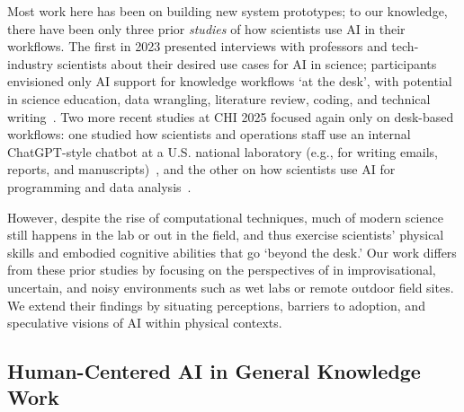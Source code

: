 Most work here has been on building new system prototypes; to our knowledge, there have been only three prior \emph{studies} of how scientists use AI in their workflows. The first in 2023 presented interviews with professors and tech-industry scientists  about their desired use cases for AI in science; participants envisioned only AI support for knowledge workflows `at the desk', with potential in science education, data wrangling, literature review, coding, and technical writing~\cite{morris2023scientists}. Two more recent studies at CHI 2025 focused again only on desk-based workflows: one studied how scientists and operations staff use an internal ChatGPT-style chatbot at a U.S. national laboratory (e.g., for writing emails, reports, and manuscripts)~\cite{wagman2025generative}, and the other on how scientists use AI for programming and data analysis~\cite{obrien2025how}.

However, despite the rise of computational techniques, much of modern science still happens in the lab or out in the field, and thus exercise scientists' physical skills and embodied cognitive abilities that go `beyond the desk.' Our work differs from these prior studies by focusing on the perspectives of  in improvisational, uncertain, and noisy environments such as wet labs or remote outdoor field sites.  We extend their findings by situating  perceptions, barriers to adoption, and speculative visions of AI within physical contexts. 

\subsection{Human-Centered AI in General Knowledge Work} 

